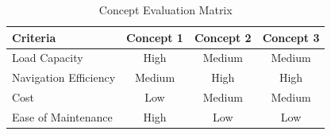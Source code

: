 \documentclass[12pt,titlepage]{article}
\begin{document}
\vspace{-10pt}
\begin{table}[h!]
\centering
\caption{Concept Evaluation Matrix}
\begin{tabular}{@{}lccc@{}}
\toprule
\textbf{Criteria}      & \textbf{Concept 1} & \textbf{Concept 2} &\textbf{Concept 3} \\ \midrule
Load Capacity          & High               & Medium              & Medium            \\
Navigation Efficiency  & Medium             & High                & High              \\
Cost                   & Low                & Medium              & Medium            \\
Ease of Maintenance    & High               & Low                 & Low               \\ \bottomrule
\end{tabular}
\label{tab:concept_evaluation}
\end{table}
\FloatBarrier
\vspace{-25pt}
\end{document}
